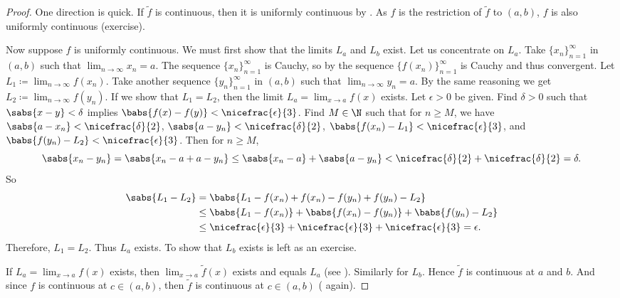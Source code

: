 \begin{proof}
One direction is quick.  If $\widetilde{f}$ is continuous, then
it is uniformly continuous by .  As $f$ is the
restriction of $\widetilde{f}$ to $(a,b)$, $f$ is also uniformly continuous
(exercise).

Now suppose $f$ is uniformly continuous.  We must first show
that the limits $L_a$ and $L_b$ exist.  Let us concentrate on $L_a$.
Take $\{ x_n \}_{n=1}^\infty$ in $(a,b)$ such that
$\lim_{n\to\infty} x_n = a$.
The sequence $\{ x_n \}_{n=1}^\infty$ is Cauchy, so by
the sequence $\bigl\{ f(x_n) \bigr\}_{n=1}^\infty$ is Cauchy and thus convergent.
Let $L_1 \coloneqq \lim_{n\to\infty} f(x_n)$.  Take another sequence
$\{ y_n \}_{n=1}^\infty$ in $(a,b)$ such that $\lim_{n\to\infty} y_n = a$.  By the same reasoning
we get $L_2 \coloneqq \lim_{n\to\infty} f(y_n)$.  If we show that $L_1 = L_2$, then
the limit $L_a = \lim_{x\to a} f(x)$ exists.  Let $\epsilon > 0$ be given.
Find $\delta > 0$ such that $\sabs{x-y} < \delta$ implies $\babs{f(x)-f(y)} <
\nicefrac{\epsilon}{3}$.  Find $M \in \N$ such that for
$n \geq M$, we have $\sabs{a-x_n} < \nicefrac{\delta}{2}$,
$\sabs{a-y_n} < \nicefrac{\delta}{2}$,
$\babs{f(x_n)-L_1} < \nicefrac{\epsilon}{3}$, and
$\babs{f(y_n)-L_2} < \nicefrac{\epsilon}{3}$.  Then for $n \geq M$,
\begin{equation*}
\sabs{x_n-y_n} = 
\sabs{x_n-a+a-y_n} \leq
\sabs{x_n-a}+\sabs{a-y_n} < \nicefrac{\delta}{2} + \nicefrac{\delta}{2} =
\delta.
\end{equation*}
So
\begin{equation*}
\begin{split}
\sabs{L_1-L_2} &=
\babs{L_1-f(x_n)+f(x_n)-f(y_n)+f(y_n)-L_2} \\
& \leq 
\babs{L_1-f(x_n)}+\babs{f(x_n)-f(y_n)}+\babs{f(y_n)-L_2} \\
& \leq
\nicefrac{\epsilon}{3} + \nicefrac{\epsilon}{3} + \nicefrac{\epsilon}{3}
=
\epsilon .
\end{split}
\end{equation*}
Therefore, $L_1 = L_2$.
Thus $L_a$ exists.  To show that $L_b$ exists is left as an exercise.

If $L_a = \lim_{x\to a} f(x)$
exists, then $\lim_{x\to a} \widetilde{f}(x)$ exists
and equals $L_a$
(see ).  Similarly for $L_b$.
Hence $\widetilde{f}$ is continuous at $a$ and $b$.  
And since $f$ is continuous at $c \in (a,b)$, then
$\widetilde{f}$ is continuous at $c \in (a,b)$ ( again).
\end{proof}

